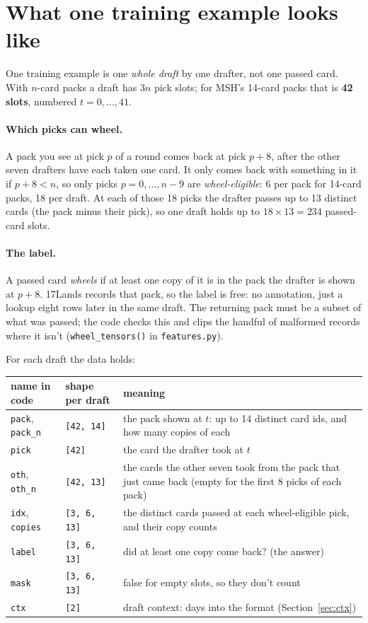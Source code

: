 \documentclass[11pt,letterpaper]{article}
\newcommand{\code}[1]{\texttt{\small #1}}
\newcommand{\shape}[1]{\texttt{\footnotesize[#1]}}
\begin{document}
\section{What one training example looks like}\label{sec:data}

One training example is one \emph{whole draft} by one drafter, not one passed card. With $n$-card packs a
draft has $3n$ pick slots; for MSH's 14-card packs that is \textbf{42 slots}, numbered $t=0,\dots,41$.

\paragraph{Which picks can wheel.} A pack you see at pick $p$ of a round comes back at pick $p+8$, after
the other seven drafters have each taken one card. It only comes back with something in it if
$p+8 < n$, so only picks $p=0,\dots,n-9$ are \emph{wheel-eligible}: 6 per pack for 14-card packs, 18 per
draft. At each of those 18 picks the drafter passes up to 13 distinct cards (the pack minus their pick), so
one draft holds up to $18\times13=234$ passed-card slots.

\paragraph{The label.} A passed card \emph{wheels} if at least one copy of it is in the pack the drafter is
shown at $p+8$. 17Lands records that pack, so the label is free: no annotation, just a lookup eight rows
later in the same draft. The returning pack must be a subset of what was passed; the code checks this and
clips the handful of malformed records where it isn't (\code{wheel\_tensors()} in
\code{features.py}).

For each draft the data holds:

\begin{center}
\footnotesize
\begin{tabular}{>{\raggedright}p{2.5cm}>{\raggedright}p{2.3cm}p{8.8cm}}
\toprule
name in code & shape per draft & meaning \\
\midrule
\code{pack}, \code{pack\_n} & \shape{42, 14} & the pack shown at $t$: up to 14 distinct card ids, and how many copies of each \\
\code{pick} & \shape{42} & the card the drafter took at $t$ \\
\code{oth}, \code{oth\_n} & \shape{42, 13} & the cards the other seven took from the pack that just came back (empty for the first 8 picks of each pack) \\
\code{idx}, \code{copies} & \shape{3, 6, 13} & the distinct cards passed at each wheel-eligible pick, and their copy counts \\
\code{label} & \shape{3, 6, 13} & did at least one copy come back? (the answer) \\
\code{mask} & \shape{3, 6, 13} & false for empty slots, so they don't count \\
\code{ctx} & \shape{2} & draft context: days into the format (Section~\ref{sec:ctx}) \\
\bottomrule
\end{tabular}
\end{center}
\end{document}
